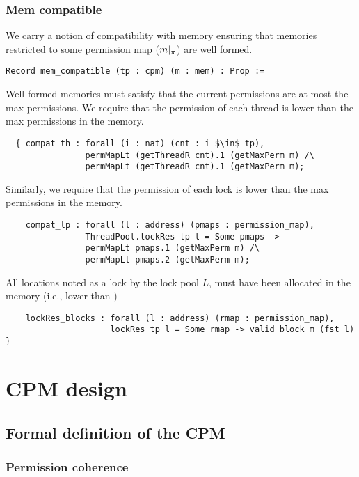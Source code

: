 \subsubsection{Mem compatible}
We carry a notion of compatibility with memory ensuring that memories restricted to some permission map ($m |_{\pi}$) are well formed.   
\begin{lstlisting}[firstnumber=1]
Record mem_compatible (tp : cpm) (m : mem) : Prop := 
\end{lstlisting}     
\noindent Well formed memories must satisfy that the current permissions are at most the max permissions. We require that the permission of each thread is lower than the max permissions in the memory. 
\begin{lstlisting}	
  { compat_th : forall (i : nat) (cnt : i $\in$ tp),
                permMapLt (getThreadR cnt).1 (getMaxPerm m) /\
                permMapLt (getThreadR cnt).1 (getMaxPerm m);
\end{lstlisting}     
\noindent Similarly, we require that the permission of each lock is lower than the max permissions in the memory. 
\begin{lstlisting}	
    compat_lp : forall (l : address) (pmaps : permission_map),
                ThreadPool.lockRes tp l = Some pmaps ->
                permMapLt pmaps.1 (getMaxPerm m) /\ 
                permMapLt pmaps.2 (getMaxPerm m);
\end{lstlisting}     
\noindent All locations noted as a lock by the lock pool $L$, must have been allocated in the memory (i.e., lower than ) 
\begin{lstlisting}	
    lockRes_blocks : forall (l : address) (rmap : permission_map),
                     lockRes tp l = Some rmap -> valid_block m (fst l) }
\end{lstlisting}

\section{CPM design}
\label{sec:implementation:cmpdesign}
\subsection{Formal definition of the CPM}
\label{sec:implementation:cmpformaldesign}
\subsubsection{Permission coherence}

